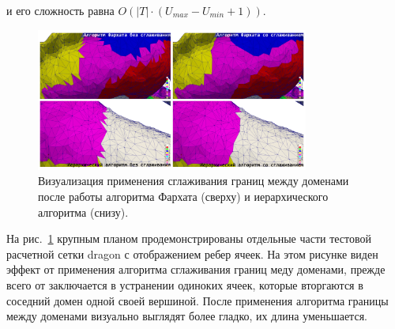 \documentclass[a4paper,14pt]{extarticle}                     %
\theoremstyle{plain}                                         %
\begin{document}
и его сложность равна $O \left( |T| \cdot (U_{max} - U_{min} + 1) \right)$.

\begin{figure}[!ht]
\centering
\includegraphics[width=0.8\textwidth]{./pics/text_2_smooth/decomp2.pdf}
\singlespacing
{}\caption{Визуализация применения сглаживания границ между доменами после работы алгоритма Фархата (сверху) и иерархического алгоритма (снизу).}
\label{fig:text_2_smooth_decomp2}
\end{figure}

На рис.~\ref{fig:text_2_smooth_decomp2} крупным планом продемонстрированы отдельные части тестовой расчетной сетки dragon с отображением ребер ячеек.
На этом рисунке виден эффект от применения алгоритма сглаживания границ меду доменами, прежде всего от заключается в устранении одиноких ячеек, которые вторгаются в соседний домен одной своей вершиной.
После применения алгоритма границы между доменами визуально выглядят более гладко, их длина уменьшается.
\end{document}
